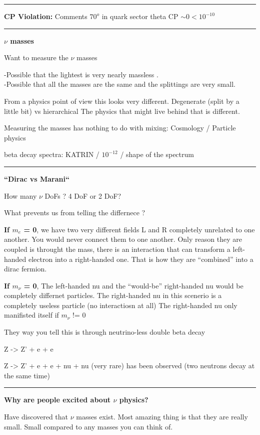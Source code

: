 {\noindent\rule{\textwidth}{1pt}

\textbf{CP Violation:}  Comments 
   $70^{o}$ in quark sector
   theta CP $\sim0  < 10^{-10}$

\noindent\rule{\textwidth}{1pt}

\textbf{$\nu$ masses}

Want to measure the $\nu$ masses

-Possible that the lightest is very nearly massless . \\
-Possible that all the masses are the same and the splittings are very small.

From a physics point of view this looks very different.
\bc
 Degenerate (split by a little bit)  vs  hierarchical 
\ec
The physics that might live behind that is different.

Measuring the masses has nothing to do with mixing: Cosmology / Particle physics 
 
beta decay spectra: KATRIN /  $10^{-12}$ / shape of the spectrum

\noindent\rule{\textwidth}{1pt}

\textbf{``Dirac vs Marani``} 

How many $\nu$ DoFs ?  4 DoF  or 2 DoF? 

What prevents us from telling the differnece ?

\textbf{If $m_e$ = 0}, we have two very different fields L and R completely unrelated to one another.
You would never connect them to one another. 
Only reason they are coupled is throught the mass, there is an interaction that can transform a left-handed electron into a right-handed one.
That is how they are ``combined'' into a dirac fermion.

\textbf{If $m_\nu$ = 0},
The left-handed nu and the ``would-be'' right-handed nu would be completely differnet particles. 
The right-handed nu in this scenerio is a completely useless particle (no interactiosn at all)
The right-handed nu only manifisted itself if $m_\nu$ != 0

They way you tell this is through neutrino-less double beta decay

 Z -> Z' + e + e 

 Z -> Z' + e + e  + nu + nu (very rare) has been observed (two neutrons decay at the same time) 


\noindent\rule{\textwidth}{1pt} 

\textbf{Why are people excited about $\nu$ physics? }

Have discovered that $\nu$ masses exist. 
Most amazing thing is that they are really small. 
Small compared to any masses you can think of. 

}
